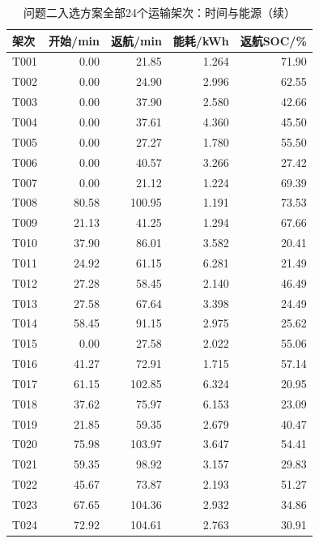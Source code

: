 \begin{table}[H]\centering\normalsize
\caption{问题二入选方案全部24个运输架次：时间与能源（续）}\label{tab:q2_flight_metrics}
\begin{tabular}{lrrrr}
\toprule
架次 & 开始/min & 返航/min & 能耗/kWh & 返航SOC/\%\\\midrule
T001 & 0.00 & 21.85 & 1.264 & 71.90\\
T002 & 0.00 & 24.90 & 2.996 & 62.55\\
T003 & 0.00 & 37.90 & 2.580 & 42.66\\
T004 & 0.00 & 37.61 & 4.360 & 45.50\\
T005 & 0.00 & 27.27 & 1.780 & 55.50\\
T006 & 0.00 & 40.57 & 3.266 & 27.42\\
T007 & 0.00 & 21.12 & 1.224 & 69.39\\
T008 & 80.58 & 100.95 & 1.191 & 73.53\\
T009 & 21.13 & 41.25 & 1.294 & 67.66\\
T010 & 37.90 & 86.01 & 3.582 & 20.41\\
T011 & 24.92 & 61.15 & 6.281 & 21.49\\
T012 & 27.28 & 58.45 & 2.140 & 46.49\\
T013 & 27.58 & 67.64 & 3.398 & 24.49\\
T014 & 58.45 & 91.15 & 2.975 & 25.62\\
T015 & 0.00 & 27.58 & 2.022 & 55.06\\
T016 & 41.27 & 72.91 & 1.715 & 57.14\\
T017 & 61.15 & 102.85 & 6.324 & 20.95\\
T018 & 37.62 & 75.97 & 6.153 & 23.09\\
T019 & 21.85 & 59.35 & 2.679 & 40.47\\
T020 & 75.98 & 103.97 & 3.647 & 54.41\\
T021 & 59.35 & 98.92 & 3.157 & 29.83\\
T022 & 45.67 & 73.87 & 2.193 & 51.27\\
T023 & 67.65 & 104.36 & 2.932 & 34.86\\
T024 & 72.92 & 104.61 & 2.763 & 30.91\\
\bottomrule\end{tabular}
\end{table}
